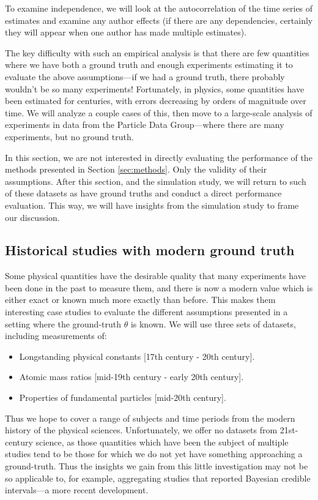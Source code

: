 \documentclass[letterpaper,12pt]{article}
\begin{document}
To examine independence, we will look at the autocorrelation of the time series of estimates and examine any author effects (if there are any dependencies, certainly they will appear when one author has made multiple estimates).

The key difficulty with such an empirical analysis is that there are few quantities where we have both a ground truth and enough experiments estimating it to evaluate the above assumptions---if we had a ground truth, there probably wouldn't be so many experiments! Fortunately, in physics, some quantities have been estimated for centuries, with errors decreasing by orders of magnitude over time. We will analyze a couple cases of this, then move to a large-scale analysis of experiments in data from the Particle Data Group---where there are many experiments, but no ground truth.

In this section, we are not interested in directly evaluating the performance of the methods presented in Section \ref{sec:methods}. Only the validity of their assumptions. After this section, and the simulation study, we will return to such of these datasets as have ground truths and conduct a direct performance evaluation. This way, we will have insights from the simulation study to frame our discussion.

\subsection{Historical studies with modern ground truth}\label{sec:historical-studies}

Some physical quantities have the desirable quality that many experiments have been done in the past to measure them, and there is now a modern value which is either exact or known much more exactly than before. This makes them interesting case studies to evaluate the different assumptions presented in a setting where the ground-truth $\theta$ is known. We will use three sets of datasets, including measurements of:
\begin{itemize}
  \item Longstanding physical constants [17th century - 20th century].
  \item Atomic mass ratios [mid-19th century - early 20th century].
  \item Properties of fundamental particles [mid-20th century].
\end{itemize}
Thus we hope to cover a range of subjects and time periods from the modern history of the physical sciences. Unfortunately, we offer no datasets from 21st-century science, as those quantities which have been the subject of multiple studies tend to be those for which we do not yet have something approaching a ground-truth. Thus the insights we gain from this little investigation may not be so applicable to, for example, aggregating studies that reported Bayesian credible intervals---a more recent development.
\end{document}
